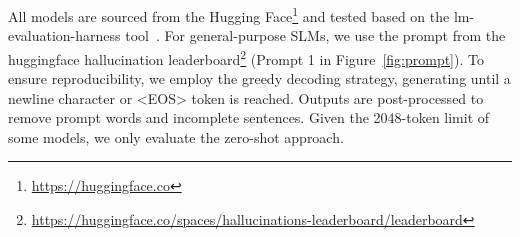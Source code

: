 






All models are sourced from the Hugging Face\footnote{\url{https://huggingface.co}} and tested based on the lm-evaluation-harness tool~\cite{eval-harness}. For general-purpose SLMs, we use the prompt from the huggingface hallucination leaderboard\footnote{\url{https://huggingface.co/spaces/hallucinations-leaderboard/leaderboard}} (Prompt 1 in Figure~\ref{fig:prompt}). To ensure reproducibility, we employ the greedy decoding strategy, generating until a newline character or <EOS> token is reached. Outputs are post-processed to remove prompt words and incomplete sentences. Given the 2048-token limit of some models, we only evaluate the zero-shot approach.

